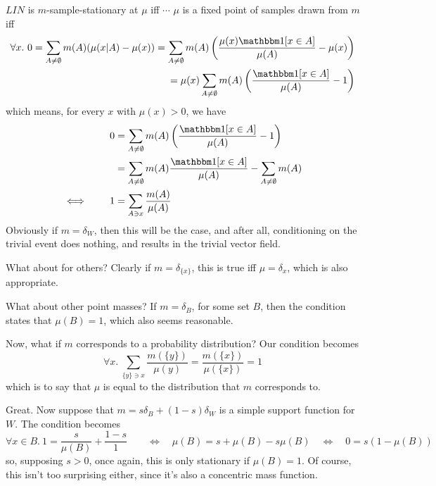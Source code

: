 \documentclass{article}
\begin{document}
\begin{computation}
    
    $\mathit{LIN}$
    is $m$-sample-stationary at $\mu$ iff $\cdots$
    \tcblower
    $\mu$ is a fixed point of samples drawn from $m$ iff
    \begin{align*}
        \forall x.~
        0 = \sum_{A \ne \emptyset} m(A) (\mu(x|A) - \mu(x)) 
        = \sum_{A \ne \emptyset} m(A) \left(
            \frac{\mu(x) \mathbbm1[x \in A]}{\mu(A)} - \mu(x) \right) \\
        = \mu(x) \sum_{A \ne \emptyset} m(A) \left(
            \frac{\mathbbm1[x \in A]}{\mu(A)} - 1 \right) \\
    \end{align*}
    which means, for every $x$ with $\mu(x) > 0$, we have
    \begin{align*}
        0 &= \sum_{A \ne \emptyset} m(A) \left( \frac{\mathbbm1[x \in A]}{\mu(A)} - 1 \right)  \\
          &= \sum_{A \ne \emptyset} m(A)\frac{\mathbbm1[x \in A]}{\mu(A)} - \sum_{A \ne \emptyset}m(A) \\
          \iff\qquad
          1 &=  \sum_{A \ni x}\frac{m(A)}{\mu(A)} \\
    \end{align*}
    Obviously if $m = \delta_W$, then this will be the case, and after all, conditioning on the trivial event does nothing, and results in the trivial vector field. 
    
    What about for others? Clearly if $m = \delta_{\{x\}}$, this is true iff $\mu = \delta_x$, which is also appropriate.
    
    What about other point masses? If $m = \delta_B$, for some set $B$, then the condition states that $\mu(B) = 1$, which also seems reasonable.
    
    Now, what if $m$ corresponds to a probability distribution? Our condition becomes
    \[
        \forall x.~ \sum_{\{y\} \ni x} \frac{m(\{y\})}{\mu(y)} = \frac{m(\{x\})}{\mu(\{x\})} = 1
    \]
    which is to say that $\mu$ is equal to the distribution that $m$ corresponds to.
    
    
    Great. Now suppose that $m = s \delta_B + (1-s) \delta_W$ is a simple support function for $W$.  The condition becomes
    \[
        \forall x \in B.~ 1= \frac{s}{\mu(B)} + \frac{1-s}{1} 
        \qquad\iff\quad
            \mu(B) = s + \mu(B) - s \mu(B)
        \quad\iff\quad
            0 = s (1 - \mu(B))
    \] 
    so, supposing $s > 0$, once again, this is only stationary if $\mu(B) = 1$. Of course, this isn't too surprising either, since it's also a concentric mass function.
    

\end{computation}
\end{document}
